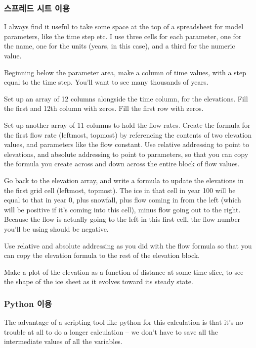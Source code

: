 {\subsubsection{스프레드 시트 이용}\index{}

I always find it useful to take some space at the top of a spreadsheet for model parameters, like the time step etc. I use three cells for each parameter, one for the name, one for the units (years, in this case), and a third for the numeric value.

Beginning below the parameter area, make a column of time values, with a step equal to the time step. You'll want to see many thousands of years.

Set up an array of 12 columns alongside the time column, for the elevations. Fill the first and 12th column with zeros. Fill the first row with zeros.

Set up another array of 11 columns to hold the flow rates. Create the formula for the first flow rate (leftmost, topmost) by referencing the contents of two elevation values, and parameters like the flow constant. Use relative addressing to point to elevations, and absolute addressing to point to parameters, so that you can copy the formula you create across and down across the entire block of flow values.

Go back to the elevation array, and write a formula to update the elevations in the first grid cell (leftmost, topmost). The ice in that cell in year 100 will be equal to that in year 0, plus snowfall, plus flow coming in from the left (which will be positive if it's coming into this cell), minus flow going out to the right. Because the flow is actually going to the left in this first cell, the flow number you'll be using should be negative.

Use relative and absolute addressing as you did with the flow formula so that you can copy the elevation formula to the rest of the elevation block.

Make a plot of the elevation as a function of distance at some time slice, to see the shape of the ice sheet as it evolves toward its steady state.


\subsubsection{Python 이용}\index{}

The advantage of a scripting tool like python for this calculation is that it's no trouble at all to do a longer calculation -- we don't have to save all the intermediate values of all the variables.

}

